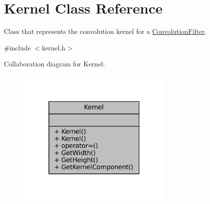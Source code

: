 \hypertarget{classKernel}{}\section{Kernel Class Reference}
\label{classKernel}


Class that represents the convolution kernel for a \hyperlink{classConvolutionFilter}{Convolution\+Filter}.  




{\ttfamily \#include $<$kernel.\+h$>$}



Collaboration diagram for Kernel\+:\nopagebreak
\begin{figure}[H]
\begin{center}
\leavevmode
\includegraphics[width=220pt]{classKernel__coll__graph}
\end{center}
\end{figure}
